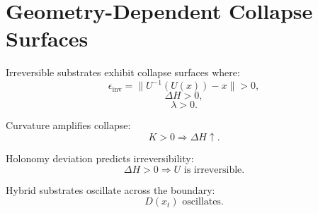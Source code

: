\section*{Geometry-Dependent Collapse Surfaces}

Irreversible substrates exhibit collapse surfaces where:
\[
\epsilon_{\text{inv}} = \|U^{-1}(U(x)) - x\| > 0,
\]
\[
\Delta H > 0,
\]
\[
\lambda > 0.
\]

Curvature amplifies collapse:
\[
K > 0 \Rightarrow \Delta H \uparrow.
\]

Holonomy deviation predicts irreversibility:
\[
\Delta H > 0 \Rightarrow U \text{ is irreversible}.
\]

Hybrid substrates oscillate across the boundary:
\[
D(x_t) \text{ oscillates}.
\]
